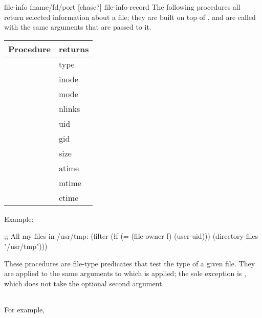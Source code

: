 \begin{defundesc}{file-info} {fname/fd/port [chase?]} {file-info-record}
The following procedures all return selected information about
a file; they are built on top of , and are
called with the same arguments that are passed to it.
\begin{inset}
\begin{tabular}{ll}
Procedure & returns \\\hline
\exi{file-type}          & type \\
\exi{file-inode}         & inode \\
\exi{file-mode}          & mode \\
\exi{file-nlinks}        & nlinks \\
\exi{file-owner}         & uid \\
\exi{file-group}         & gid \\
\exi{file-size}          & size \\
\exi{file-last-access}   & atime \\
\exi{file-last-mod}      & mtime \\
\exi{file-last-status-change} & ctime
\end{tabular}
\end{inset}
%
Example:
\begin{code}    
;; All my files in /usr/tmp:
(filter (\l{f} (= (file-owner f) (user-uid)))
        (directory-files "/usr/tmp")))\end{code}

\end{defundesc}

\begin{desc}
These procedures are file-type predicates that test the
type of a given file.
They are applied to the same arguments to which  is applied;
the sole exception is , which does not take
the optional  second argument.
\begin{inset}
\begin{tabular}{l@{\qquad}l}
\end{tabular}
\end{inset}
For example,
\end{desc}

